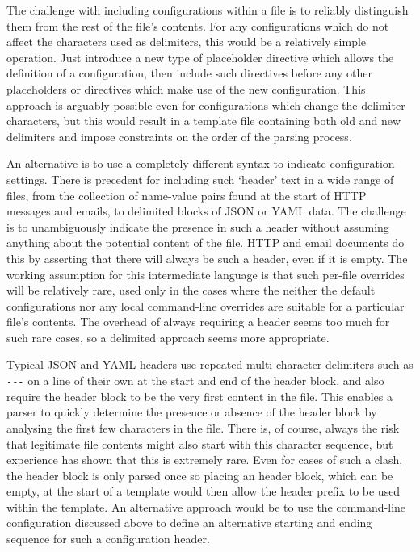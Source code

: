 The challenge with including configurations within a file is to reliably distinguish them from the rest of the file's contents. For any configurations which do not affect the characters used as delimiters, this would be a relatively simple operation. Just introduce a new type of placeholder directive which allows the definition of a configuration, then include such directives before any other placeholders or directives which make use of the new configuration. This approach is arguably possible even for configurations which change the delimiter characters, but this would result in a template file containing both old and new delimiters and impose constraints on the order of the parsing process.

An alternative is to use a completely different syntax to indicate configuration settings. There is precedent for including such `header' text in a wide range of files, from the collection of name-value pairs found at the start of HTTP messages and emails, to delimited blocks of JSON or YAML data. The challenge is to unambiguously indicate the presence in such a header without assuming anything about the potential content of the file. HTTP and email documents do this by asserting that there will always be such a header, even if it is empty. The working assumption for this intermediate language is that such per-file overrides will be relatively rare, used only in the cases where the neither the default configurations nor any local command-line overrides are suitable for a particular file's contents. The overhead of always requiring a header seems too much for such rare cases, so a delimited approach seems more appropriate.

Typical JSON and YAML headers use repeated multi-character delimiters such as \verb!---! on a line of their own at the start and end of the header block, and also require the header block to be the very first content in the file. This enables a parser to quickly determine the presence or absence of the header block by analysing the first few characters in the file. There is, of course, always the risk that legitimate file contents might also start with this character sequence, but experience has shown that this is extremely rare. Even for cases of such a clash, the header block is only parsed once so placing an header block, which can be empty, at the start of a template would then allow the header prefix to be used within the template. An alternative approach would be to use the command-line configuration discussed above to define an alternative starting and ending sequence for such a configuration header.

